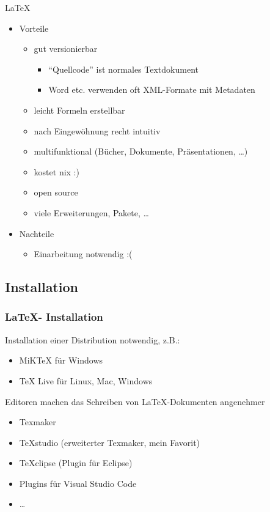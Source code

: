 \documentclass[18pt]{beamer}
\begin{document}
	\begin{frame}{\LaTeX}
	\begin{itemize}
		\item Vorteile
		\begin{itemize}
			\item gut versionierbar
			\begin{itemize}
				\item \enquote{Quellcode} ist normales Textdokument
				\item Word etc. verwenden oft XML-Formate mit Metadaten
			\end{itemize}
			\item leicht Formeln erstellbar
			\item nach Eingewöhnung recht intuitiv
			\item multifunktional (Bücher, Dokumente, Präsentationen, \dots)
			\item kostet nix :)
			\item open source
			\item viele Erweiterungen, Pakete, \dots
		\end{itemize}
		\item Nachteile
		\begin{itemize}
			\item Einarbeitung notwendig :(
		\end{itemize} 
	\end{itemize}
				
\end{frame}
	
	\subsection{Installation}
	\begin{frame}
		\frametitle{\LaTeX - Installation}
		Installation einer Distribution notwendig, z.B.:
		\begin{itemize}
			\item  MiKTeX für Windows
			\item TeX Live für Linux, Mac, Windows
		\end{itemize}
		\pause
		Editoren machen das Schreiben von \LaTeX -Dokumenten angenehmer
		\begin{itemize}
			\item Texmaker
			\item TeXstudio (erweiterter Texmaker, mein Favorit)
			\item TeXclipse (Plugin für Eclipse)
			\item Plugins für Visual Studio Code
			\item \dots
		\end{itemize}
	\end{frame}
	
\end{document}

